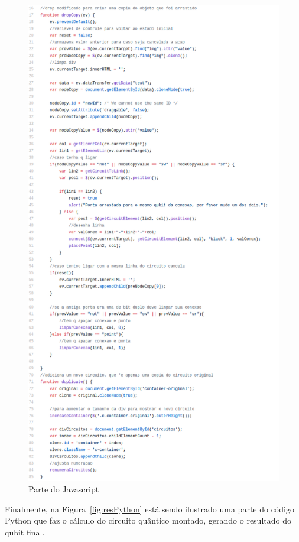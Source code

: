 \documentclass[a4paper, 12pt, oneside]{book}
\begin{document}
\begin{figure}[H]
\centering
\includegraphics[scale=0.43]{javascript.png}
\caption{Parte do Javascript}
\label{fig:resJavascript}
\end{figure}

Finalmente, na Figura~\ref{fig:resPython} está sendo ilustrado uma parte do código Python que faz o cálculo do circuito quântico montado, gerando o resultado do qubit final.
\end{document}
